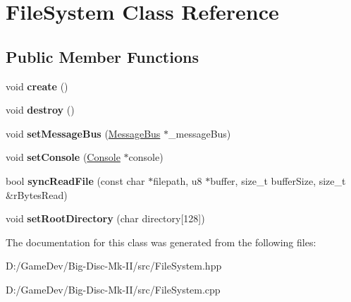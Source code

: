 \hypertarget{class_file_system}{}\section{File\+System Class Reference}
\label{class_file_system}
\subsection*{Public Member Functions}
\begin{DoxyCompactItemize}
\item 
\mbox{\label{class_file_system_a6aedfa8596007c6ada69df6e651a1568}} 
void {\bfseries create} ()
\item 
\mbox{\label{class_file_system_a775c5b03a5a945c8b15eb66537997094}} 
void {\bfseries destroy} ()
\item 
\mbox{\label{class_file_system_a84fed22f88285eaf1620351911816fa5}} 
void {\bfseries set\+Message\+Bus} (\mbox{\hyperlink{class_message_bus}{Message\+Bus}} $\ast$\+\_\+message\+Bus)
\item 
\mbox{\label{class_file_system_acad38d2a51f0b1fea64b775d0c6f4ba7}} 
void {\bfseries set\+Console} (\mbox{\hyperlink{class_console}{Console}} $\ast$console)
\item 
\mbox{\label{class_file_system_a9433168c1105cd8d19c274373b67c622}} 
bool {\bfseries sync\+Read\+File} (const char $\ast$filepath, u8 $\ast$buffer, size\+\_\+t buffer\+Size, size\+\_\+t \&r\+Bytes\+Read)
\item 
\mbox{\label{class_file_system_aa11237092008401e0fdcf35c3bd7e440}} 
void {\bfseries set\+Root\+Directory} (char directory\mbox{[}128\mbox{]})
\end{DoxyCompactItemize}


The documentation for this class was generated from the following files\+:\begin{DoxyCompactItemize}
\item 
D\+:/\+Game\+Dev/\+Big-\/\+Disc-\/\+Mk-\/\+I\+I/src/File\+System.\+hpp\item 
D\+:/\+Game\+Dev/\+Big-\/\+Disc-\/\+Mk-\/\+I\+I/src/File\+System.\+cpp\end{DoxyCompactItemize}
